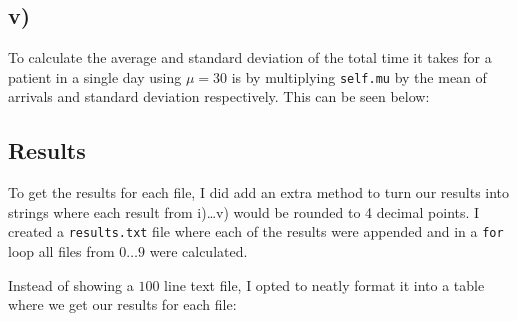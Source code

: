 \documentclass[11pt, letterpaper]{article}
\begin{document}
\subsection*{v)}
To calculate the average and standard deviation of the total time it takes
for a patient in a single day using $\mu = 30$ is by multiplying \verb|self.mu|
by the mean
of arrivals and standard deviation respectively. This can be seen below:

\begin{file}[q5.py]
	
\end{file}

\subsection*{Results}
To get the results for each file, I did add an extra method to turn our results
into strings where each
result from i)\dots v) would be rounded to 4 decimal points. I created a
\verb|results.txt| file where each of the results
were appended and in a \verb|for| loop all files from $0\dots 9$ were
calculated.

\begin{file}[q5.py]
	
\end{file}

Instead of showing a $100$ line text file, I opted to neatly format it into a
table where we get our
results for each file:
\end{document}
